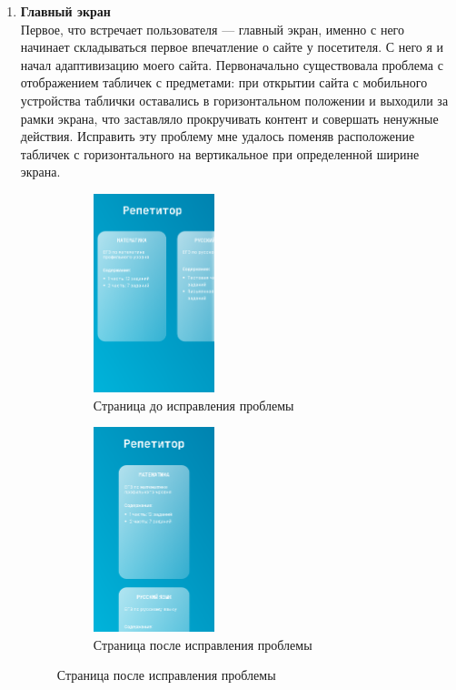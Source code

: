 \documentclass[a4paper, 12pt]{extarticle}
\begin{document}
\begin{enumerate}
    \item {\textbf{Главный экран}}\\
    Первое, что встречает пользователя — главный экран, именно с него начинает
    складываться первое впечатление о сайте у посетителя. С него я и начал
    адаптивизацию моего сайта. Первоначально существовала проблема с отображением
    табличек с предметами: при открытии сайта с мобильного устройства таблички
    оставались в горизонтальном положении и выходили за рамки экрана, что
    заставляло прокручивать контент и совершать ненужные действия. Исправить эту
    проблему мне удалось поменяв расположение табличек с горизонтального на
    вертикальное при определенной ширине экрана.
    \begin{figure}[h]
        \begin{subfigure}{.5\textwidth}
            \centering
            \includegraphics[width=100pt]{./img/phoneMainPageBug.png}
            \caption{Страница до исправления проблемы}
        \end{subfigure}
        \begin{subfigure}{.5\textwidth}
            \centering
            \includegraphics[width=100pt]{./img/phoneMainPage.png}
            \caption{Страница после исправления проблемы}
        \end{subfigure}
    \end{figure}

\end{enumerate}
\end{document}
